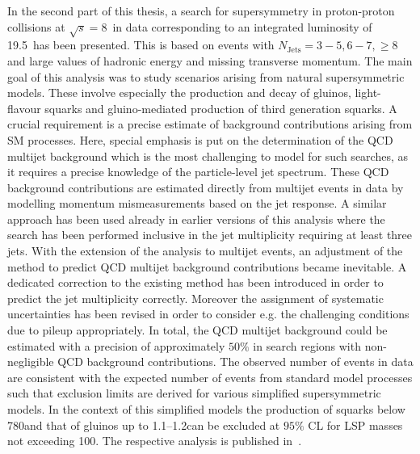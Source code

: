 In the second part of this thesis, a search for supersymmetry in proton-proton collisions at $\sqrt{s}=8$~\tev in data corresponding to an integrated luminosity of 19.5~\fbinv has been presented. This is based on events with $N_\mathrm{Jets} = 3-5, 6-7, \ge 8$ and large values of hadronic energy and missing transverse momentum. The main goal of this analysis was to study scenarios arising from natural supersymmetric models. These involve especially the production and decay of gluinos, light-flavour squarks and gluino-mediated production of third generation squarks. A crucial requirement is a precise estimate of background contributions arising from SM processes. Here, special emphasis is put on the determination of the QCD multijet background which is the most challenging to model for such searches, as it requires a precise knowledge of the particle-level jet spectrum. These QCD background contributions are estimated directly from multijet events in data by modelling momentum mismeasurements based on the jet response. A similar approach has been used already in earlier versions of this analysis where the search has been performed inclusive in the jet multiplicity requiring at least three jets. With the extension of the analysis to multijet events, an adjustment of the method to predict QCD multijet background contributions became inevitable. A dedicated correction to the existing method has been introduced in order to predict the jet multiplicity correctly. Moreover the assignment of systematic uncertainties has been revised in order to consider e.g. the challenging conditions due to pileup appropriately. In total, the QCD multijet background could be estimated with a precision of approximately $50\%$ in search regions with non-negligible QCD background contributions. The observed number of events in data are consistent with the expected number of events from standard model processes such that exclusion limits are derived for various simplified supersymmetric models. In the context of this simplified models the production of squarks below 780\gev and that of gluinos up to 1.1--1.2\tev can be excluded at $95\%$ CL for LSP masses not exceeding 100\gev. The respective analysis is published in~\cite{Chatrchyan:2014lfa}. \\
